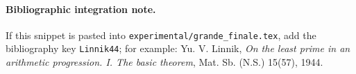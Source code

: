 \paragraph{Bibliographic integration note.}
If this snippet is pasted into \texttt{experimental/grande\_finale.tex}, add
the bibliography key \texttt{Linnik44}; for example:
Yu. V. Linnik, \emph{On the least prime in an arithmetic progression. I. The
basic theorem}, Mat. Sb. (N.S.) 15(57), 1944.
